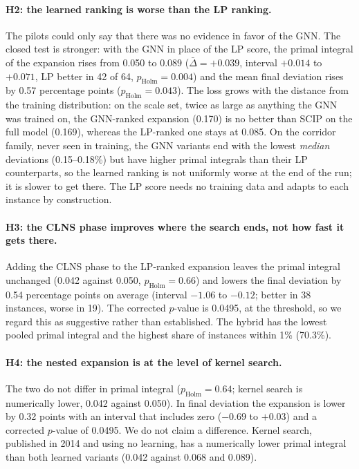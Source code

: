 \paragraph{H2: the learned ranking is worse than the LP ranking.} The pilots could only say that
there was no evidence in favor of the GNN. The closed test is stronger: with the GNN in place of
the LP score, the primal integral of the expansion rises from 0.050 to 0.089
($\bar\Delta=+0.039$, interval $+0.014$ to $+0.071$, LP better in 42 of 64,
$p_{\mathrm{Holm}}=0.004$) and the mean final deviation rises by 0.57 percentage points
($p_{\mathrm{Holm}}=0.043$). The loss grows with the distance from the training distribution: on
the scale set, twice as large as anything the GNN was trained on, the GNN-ranked expansion
(0.170) is no better than SCIP on the full model (0.169), whereas the LP-ranked one stays at
0.085. On the corridor family, never seen in training, the GNN variants end with the lowest
\emph{median} deviations (0.15--0.18\%) but have higher primal integrals than their LP
counterparts, so the learned ranking is not uniformly worse at the end of the run; it is slower
to get there. The LP score needs no training data and adapts to each instance by construction.

\paragraph{H3: the CLNS phase improves where the search ends, not how fast it gets there.}
Adding the CLNS phase to the LP-ranked expansion leaves the primal integral unchanged (0.042
against 0.050, $p_{\mathrm{Holm}}=0.66$) and lowers the final deviation by 0.54 percentage
points on average (interval $-1.06$ to $-0.12$; better in 38 instances, worse in 19). The
corrected $p$-value is 0.0495, at the threshold, so we regard this as suggestive rather than
established. The hybrid has the lowest pooled primal integral and the highest share of instances
within 1\% (70.3\%).

\paragraph{H4: the nested expansion is at the level of kernel search.} The two do not differ in
primal integral ($p_{\mathrm{Holm}}=0.64$; kernel search is numerically lower, 0.042 against
0.050). In final deviation the expansion is lower by 0.32 points with an interval that includes
zero ($-0.69$ to $+0.03$) and a corrected $p$-value of 0.0495. We do not claim a difference.
Kernel search, published in 2014 and using no learning, has a numerically lower primal
integral than both learned variants (0.042 against 0.068 and 0.089).

